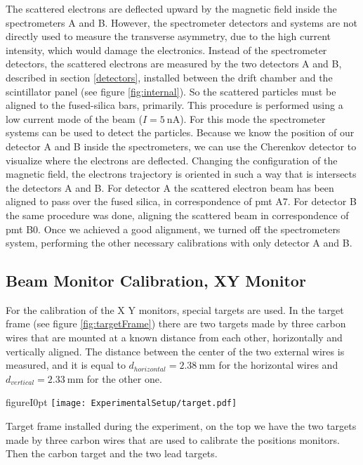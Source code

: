 The scattered electrons are deflected upward by the magnetic field inside the spectrometers A and B. However, the spectrometer detectors and systems are not directly used to measure the transverse asymmetry, due to the high current intensity, which would damage the electronics.
Instead of the spectrometer detectors, the scattered electrons are measured by the two detectors A and B, described in section \ref{detectors}, installed between the drift chamber and the scintillator panel (see figure \ref{fig:internal}). So the scattered particles must be aligned to the fused-silica bars, primarily.
This procedure is performed using a low current mode of the beam ($I = \SI{5}{\nano \ampere}$). For this mode the spectrometer systems can be used to detect the particles. Because we know the position of our detector A and B inside the spectrometers, we can use the Cherenkov detector to visualize where the electrons are deflected. Changing the configuration of the magnetic field, the electrons trajectory is oriented in such a way that is intersects the detectors A and B. For detector A the scattered electron beam has been aligned to pass over the fused silica, in correspondence of pmt A7. For detector B the same procedure was done, aligning the scattered beam in correspondence of pmt B0. 
 Once we achieved a good alignment, we turned off the spectrometers system, performing the other necessary calibrations with only detector A and B. 

\subsection{Beam Monitor Calibration, XY Monitor}

For the calibration of the X Y monitors, special targets are used. In the target frame (see figure \ref{fig:targetFrame}) there are two targets made by three carbon wires that are mounted at a known distance from each other, horizontally and vertically aligned. The distance between the center of the two external wires is measured, and it is equal to $ d_{horizontal} = \SI{2.38}{\milli \meter}$ for the horizontal wires and $d_{vertical} = \SI{2.33}{\milli \meter}$ for the other one.

\begin{wrapfloat}{figure}{I}{0pt}
\centering
\texttt{[image: ExperimentalSetup/target.pdf]}
\caption{\label{fig:targetFrame} Target frame installed during the experiment, on the top we have the two targets made by three carbon wires that are used to calibrate the positions monitors. Then the carbon target and the two lead targets.}
\vspace{-150pt}
\end{wrapfloat}

